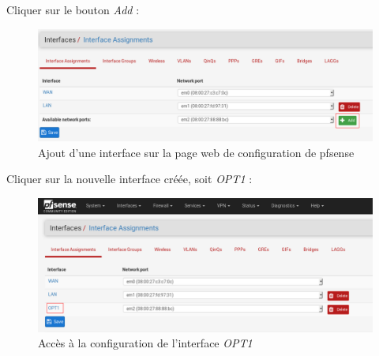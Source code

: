 \pagebreak
Cliquer sur le bouton \textit{Add} :
  \begin{figure}[h!]
     \begin{center}
         \includegraphics[scale=0.6]{Debian_screenshots/Config/9.png}
         \caption{Ajout d'une interface sur la page web de configuration de pfsense}
         \label{Debian_screenshots/Config/9}
     \end{center}
  \end{figure}
  \FloatBarrier
     
Cliquer sur la nouvelle interface créée, soit \textit{OPT1} :
  \begin{figure}[h!]
     \begin{center}
         \includegraphics[scale=0.6]{Debian_screenshots/Config/10.png}
         \caption{Accès à la configuration de l'interface \textit{OPT1}}
         \label{Debian_screenshots/Config/10}
     \end{center}
  \end{figure}
  \FloatBarrier

